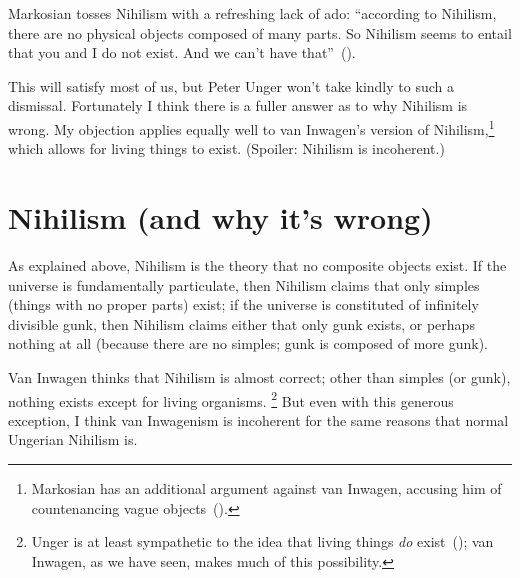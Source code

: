Markosian tosses Nihilism with a refreshing lack of ado: ``according to Nihilism, there are no physical objects composed of many parts. So Nihilism seems to entail that you and I do not exist. And we can't have that''~(\citeyear[220]{markosian1998a}).

This will satisfy most of us, but Peter Unger won't take kindly to such a dismissal. Fortunately I think there is a fuller answer as to why Nihilism is wrong. My objection applies equally well to van Inwagen's version of Nihilism,\footnote{Markosian has an additional argument against van Inwagen, accusing him of countenancing vague objects~(\citeyear[222--223]{markosian1998a}).} which allows for living things to exist. (Spoiler: Nihilism is incoherent.)

\section{Nihilism (and why it's wrong)}
As explained above, Nihilism is the theory that no composite objects exist. If the universe is fundamentally particulate, then Nihilism claims that only simples (things with no proper parts) exist; if the universe is constituted of infinitely divisible gunk, then Nihilism claims either that only gunk exists, or perhaps nothing at all (because there are no simples; gunk is composed of more gunk).

Van Inwagen thinks that Nihilism is almost correct; other than simples (or gunk), nothing exists except for living organisms.%
%
\footnote{Unger is at least sympathetic to the idea that living things {\em do} exist~(\citeyear[151]{unger1979}); van Inwagen, as we have seen, makes much of this possibility.} %
%
But even with this generous exception, I think van Inwagenism is incoherent for the same reasons that normal Ungerian Nihilism is.

